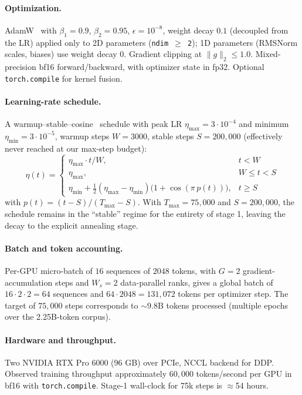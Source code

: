 \documentclass[11pt,a4paper]{article}
\begin{document}
\paragraph{Optimization.}
AdamW~\cite{adamw} with $\beta_1 = 0.9$, $\beta_2 = 0.95$, $\epsilon = 10^{-8}$,
weight decay $0.1$ (decoupled from the LR) applied only to 2D parameters
(\texttt{ndim $\ge$ 2}); 1D parameters (RMSNorm scales, biases) use weight
decay 0. Gradient clipping at $\|g\|_2 \le 1.0$. Mixed-precision bf16
forward/backward, with optimizer state in fp32. Optional
\texttt{torch.compile} for kernel fusion.

\paragraph{Learning-rate schedule.}
A warmup--stable--cosine~\cite{wsd} schedule with peak LR
$\eta_{\max} = 3 \cdot 10^{-4}$ and minimum $\eta_{\min} = 3 \cdot 10^{-5}$,
warmup steps $W = 3000$, stable steps $S = 200{,}000$ (effectively never
reached at our max-step budget):
\begin{equation}
\eta(t) = \begin{cases}
\eta_{\max} \cdot t / W, & t < W \\[2pt]
\eta_{\max}, & W \le t < S \\[2pt]
\eta_{\min} + \tfrac{1}{2}(\eta_{\max} - \eta_{\min})\bigl(1 + \cos(\pi\, p(t))\bigr), & t \ge S
\end{cases}
\end{equation}
with $p(t) = (t - S) / (T_{\max} - S)$. With $T_{\max} = 75{,}000$ and
$S = 200{,}000$, the schedule remains in the ``stable'' regime for the
entirety of stage 1, leaving the decay to the explicit annealing stage.

\paragraph{Batch and token accounting.}
Per-GPU micro-batch of $16$ sequences of $2048$ tokens, with $G = 2$
gradient-accumulation steps and $W_s = 2$ data-parallel ranks, gives a
global batch of $16 \cdot 2 \cdot 2 = 64$ sequences and
$64 \cdot 2048 = 131{,}072$ tokens per optimizer step. The target of
$75{,}000$ steps corresponds to $\sim$9.8B tokens processed (multiple
epochs over the 2.25B-token corpus).

\paragraph{Hardware and throughput.}
Two NVIDIA RTX Pro 6000 (96 GB) over PCIe, NCCL backend for DDP.
Observed training throughput approximately $60{,}000$ tokens/second per GPU
in bf16 with \texttt{torch.compile}. Stage-1 wall-clock for 75k steps is
$\approx$54 hours.
\end{document}

